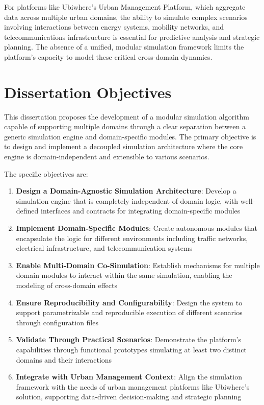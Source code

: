 For platforms like Ubiwhere's Urban Management Platform, which aggregate data across multiple urban domains, the ability to simulate complex scenarios involving interactions between energy systems, mobility networks, and telecommunications infrastructure is essential for predictive analysis and strategic planning. The absence of a unified, modular simulation framework limits the platform's capacity to model these critical cross-domain dynamics.


\section{Dissertation Objectives}

This dissertation proposes the development of a modular simulation algorithm capable of supporting multiple domains through a clear separation between a generic simulation engine and domain-specific modules. The primary objective is to design and implement a decoupled simulation architecture where the core engine is domain-independent and extensible to various scenarios.

The specific objectives are:

\begin{enumerate}
    \item \textbf{Design a Domain-Agnostic Simulation Architecture}: Develop a simulation engine that is completely independent of domain logic, with well-defined interfaces and contracts for integrating domain-specific modules
    
    \item \textbf{Implement Domain-Specific Modules}: Create autonomous modules that encapsulate the logic for different environments including traffic networks, electrical infrastructure, and telecommunication systems
    
    \item \textbf{Enable Multi-Domain Co-Simulation}: Establish mechanisms for multiple domain modules to interact within the same simulation, enabling the modeling of cross-domain effects
    
    \item \textbf{Ensure Reproducibility and Configurability}: Design the system to support parametrizable and reproducible execution of different scenarios through configuration files
    
    \item \textbf{Validate Through Practical Scenarios}: Demonstrate the platform's capabilities through functional prototypes simulating at least two distinct domains and their interactions
    
    \item \textbf{Integrate with Urban Management Context}: Align the simulation framework with the needs of urban management platforms like Ubiwhere's solution, supporting data-driven decision-making and strategic planning
\end{enumerate}


